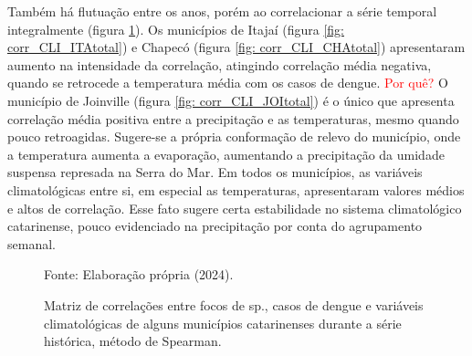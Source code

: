 \documentclass[
	12pt,				%
	openright,			%
	oneside,			%
	a4paper,			%
	english,			%
	french,				%
	spanish,			%
	brazil				%
	dvipsnames, table]{abntex2}
\begin{document}
Também há flutuação entre os anos, porém ao correlacionar a série temporal integralmente (figura \ref{fig: matriz_corr_CLItotal}). Os municípios de Itajaí (figura \ref{fig: corr_CLI_ITAtotal}) e Chapecó (figura \ref{fig: corr_CLI_CHAtotal}) apresentaram aumento na intensidade da correlação, atingindo correlação média negativa, quando se retrocede a temperatura média com os casos de dengue. \textcolor{red}{Por quê?} O município de Joinville (figura \ref{fig: corr_CLI_JOItotal}) é o único que apresenta correlação média positiva entre a precipitação e as temperaturas, mesmo quando pouco retroagidas. Sugere-se a própria conformação de relevo do município, onde a temperatura aumenta a evaporação, aumentando a precipitação da umidade suspensa represada na Serra do Mar. Em todos os municípios, as variáveis climatológicas entre si, em especial as temperaturas, apresentaram valores médios e altos de correlação. Esse fato sugere certa estabilidade no sistema climatológico catarinense, pouco evidenciado na precipitação por conta do agrupamento semanal.

\begin{figure}[htbp]
    \begin{center}
    \caption{Matriz de correlações entre focos de  sp., casos de dengue e variáveis climatológicas de alguns municípios catarinenses durante a série histórica, método de Spearman.}
    \label{fig: matriz_corr_CLItotal}
    \hfill
    \hfill
    \end{center}
    \small{Fonte: Elaboração própria (2024).}
\end{figure}


\end{document}
